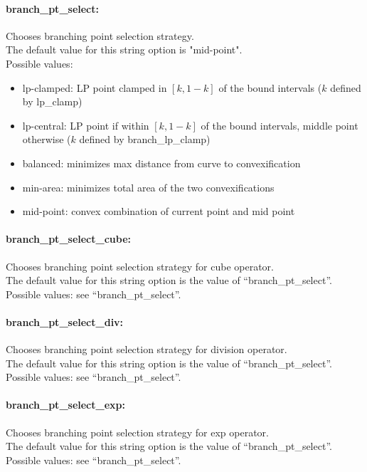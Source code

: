 \paragraph{branch\_pt\_select:}\label{sec:branch_pt_select} Chooses branching point selection strategy. $\;$ \\
The default value for this string option is "mid-point". \\ 
Possible values:
\begin{itemize}
   \item lp-clamped: LP point clamped in $[k,1-k]$ of the bound intervals ($k$ defined by lp\_clamp)
   \item lp-central: LP point if within $[k,1-k]$ of the bound intervals, middle point otherwise ($k$ defined by branch\_lp\_clamp)
   \item balanced: minimizes max distance from curve to convexification
   \item min-area: minimizes total area of the two convexifications
   \item mid-point: convex combination of current point and mid point
\end{itemize}

\paragraph{branch\_pt\_select\_cube:}\label{sec:branch_pt_select_cube} Chooses branching point selection strategy for cube operator. $\;$ \\
The default value for this string option is the value of ``branch\_pt\_select''. \\
Possible values: see ``branch\_pt\_select''.

\paragraph{branch\_pt\_select\_div:}\label{sec:branch_pt_select_div} Chooses branching point selection strategy for division operator. $\;$ \\
The default value for this string option is the value of ``branch\_pt\_select''. \\
Possible values: see ``branch\_pt\_select''.

\paragraph{branch\_pt\_select\_exp:}\label{sec:branch_pt_select_exp} Chooses branching point selection strategy for exp operator. $\;$ \\
The default value for this string option is the value of ``branch\_pt\_select''. \\
Possible values: see ``branch\_pt\_select''.

